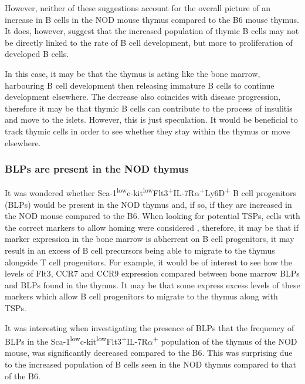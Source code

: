 However, neither of these suggestions account for the overall picture of an increase in B cells in the NOD mouse thymus compared to the B6 mouse thymus.
It does, however, suggest that the increased population of thymic B cells may not be directly linked to the rate of B cell development, but more to proliferation of developed B cells.

In this case, it may be that the thymus is acting like the bone marrow, harbouring B cell development then releasing immature B cells to continue development elsewhere.
The decrease also coincides with disease progression, therefore it may be that thymic B cells can contribute to the process of insulitis and move to the islets.
However, this is just speculation.
It would be beneficial to track thymic cells in order to see whether they stay within the thymus or move elsewhere.


\subsubsection{BLPs are present in the NOD thymus}


It was wondered whether Sca-1\textsuperscript{low}c-kit\textsuperscript{low}Flt3\textsuperscript{+}IL-7R$\alpha$\textsuperscript{+}Ly6D\textsuperscript{+} B cell progenitors (BLPs) would be present in the NOD thymus and, if so, if they are increased in the NOD mouse compared to the B6.
When looking for potential TSPs, cells with the correct markers to allow homing were considered \citep{Zlotoff2011}, therefore, it may be that if marker expression in the bone marrow is abherrent on B cell progenitors, it may result in an excess of B cell precursors being able to migrate to the thymus alongside T cell progenitors.
For example, it would be of interest to see how the levels of Flt3, CCR7 and CCR9 expression compared between bone marrow BLPs and BLPs found in the thymus.
It may be that some express excess levels of these markers which allow B cell progenitors to migrate to the thymus along with TSPs.

It was interesting when investigating the presence of BLPs that the frequency of BLPs in the Sca-1\textsuperscript{low}c-kit\textsuperscript{low}Flt3\textsuperscript{+}IL-7R$\alpha$\textsuperscript{+} population of the thymus of the NOD mouse, was significantly decreased compared to the B6.
This was surprising due to the increased population of B cells seen in the NOD thymus compared to that of the B6.

